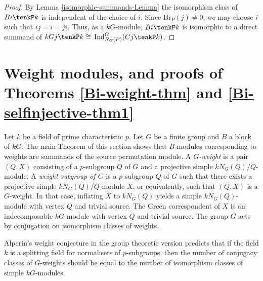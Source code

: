 \documentclass{amsart}
\theoremstyle{plain}\newtheorem{Theorem}{Theorem}[section]
\theoremstyle{plain}\newtheorem{Conjecture}[Theorem]{Conjecture}
\theoremstyle{plain}\newtheorem{Corollary}[Theorem]{Corollary}
\theoremstyle{plain}\newtheorem{Lemma}[Theorem]{Lemma}
\theoremstyle{plain}\newtheorem{Proposition}[Theorem]{Proposition}
\theoremstyle{definition}\newtheorem{Definition}[Theorem]{Definition}
\theoremstyle{definition}\newtheorem{Example}[Theorem]{Example}
\theoremstyle{definition}\newtheorem{Examples}[Theorem]{Examples}
\theoremstyle{definition}\newtheorem{Exercise}[Theorem]{Exercise}
\theoremstyle{definition}\newtheorem{Notation}[Theorem]{Notation}
\theoremstyle{definition}\newtheorem{Remark}[Theorem]{Remark}
\theoremstyle{definition}\newtheorem{Remarks}[Theorem]{Remarks}
\theoremstyle{plain}\newtheorem{Statement}[Theorem]{}
\def\Br{\mathrm{Br}}                 \def\ten{\otimes}
\def\Ind{\mathrm{Ind}}    \def\tenC{\otimes_C}
\begin{document}
\begin{proof}
By   Lemma \ref{isomorphic-summands-Lemma} the isomorphism class
of $Bi\tenkP k$ is independent of the choice of $i$. 
Since $\Br_P(j)\neq 0$, we may choose $i$ such that $ij=i=ji$.
Thus, as a $kG$-module, $Bi\tenkP k$ is isomorphic to a direct summand of
$kGj\tenkP k\cong$ $\Ind^G_{N_G(P)}(Cj \tenkP k)$.
\end{proof}




\section{Weight modules, and proofs of Theorems \ref{Bi-weight-thm} and
\ref{Bi-selfinjective-thm1} } \label{weight-section}

Let $k$ be a field of prime characteristic $p$. Let $G$ be a finite group and
$B$ a block of $kG$.
The  main  Theorem of this section  shows that $B$-modules corresponding to weights are 
summands of the source permutation module.  A {\em $G$-weight} is a pair $(Q,X)$
consisting of a $p$-subgroup $Q$ of $G$ and a projective simple
$kN_G(Q)/Q$-module.  A {\em weight subgroup of $G$} is a $p$-subgroup $Q$ of
$G$ such that there exists a projective simple $kN_G(Q)/Q$-module $X$, or
equivalently, such that $(Q,X)$ is a $G$-weight. In that case, inflating $X$ to 
$kN_G(Q)$ yields a simple $kN_G(Q)$-module with vertex $Q$ and trivial source. 
The Green correspondent of $X$ is an indecomposable $kG$-module with vertex 
$Q$  and trivial source. The group $G$ acts by conjugation on isomorphism
classes of weights. 
 
Alperin's weight conjecture \cite{Alp87}  in the group 
theoretic version predicts that if the field $k$ is a splitting field for normalisers
of $p$-subgroups, then the number of conjugacy classes of $G$-weights 
should be equal  to the number of isomorphism classes of simple $kG$-modules. 
\end{document}
